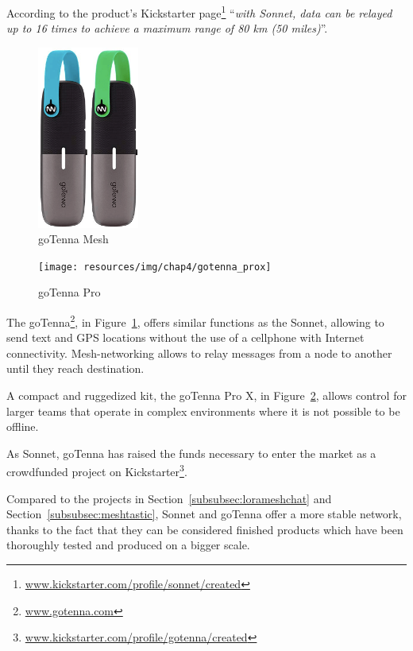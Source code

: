 				According to the product's Kickstarter page\footnote{ \url{www.kickstarter.com/profile/sonnet/created}} ``\textit{with Sonnet, data can be relayed up to 16 times to achieve a maximum range of 80 km (50 miles)}''.

				\begin{minipage}{0.5\textwidth}%
					\begin{figure}[H]
						\centering
						\includegraphics[height=6cm]{resources/img/chap4/gotenna}
						\caption{goTenna Mesh}
						\label{img:gotenna}
					\end{figure}
				\end{minipage}%
				\hfill%
				\begin{minipage}{0.5\textwidth}\raggedright
					\begin{figure}[H]
						\centering
						\texttt{[image: resources/img/chap4/gotenna\_prox]}
						\caption{goTenna Pro}
						\label{img:gotenna_pro}
					\end{figure}
				\end{minipage}%
				\newpage
				
				The goTenna\footnote{ \url{www.gotenna.com}}, in Figure~\ref{img:gotenna}, offers similar functions as the Sonnet, allowing to send text and GPS locations without the use of a cellphone with Internet connectivity.
				Mesh-networking allows to relay messages from a node to another until they reach destination.
				
				A compact and ruggedized kit, the goTenna Pro X, in Figure~\ref{img:gotenna_pro}, allows control for larger teams that operate in complex environments where it is not possible to be offline.
						
				As Sonnet, goTenna has raised the funds necessary to enter the market as a crowdfunded project on Kickstarter\footnote{ \url{www.kickstarter.com/profile/gotenna/created}}.
				
				Compared to the projects in Section~\ref{subsubsec:lorameshchat} and Section~\ref{subsubsec:meshtastic}, Sonnet and goTenna offer a more stable network, thanks to the fact that they can be considered finished products which have been thoroughly tested and produced on a bigger scale.
						

